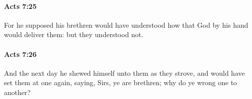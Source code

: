 		\paragraph{Acts 7:25} %
			\label{ACTS-7-25}

			For he supposed his brethren would have understood how that God by his hand would deliver them: but they understood not.

			\begin{framed}
			\scriptsize
				\begin{compactdesc}
					\item[SBLG] 
				\end{compactdesc}
			\end{framed}

		\paragraph{Acts 7:26} %
			\label{ACTS-7-26}

			And the next day he shewed himself unto them as they strove, and would have set them at one again, saying, Sirs, ye are brethren; why do ye wrong one to another?

